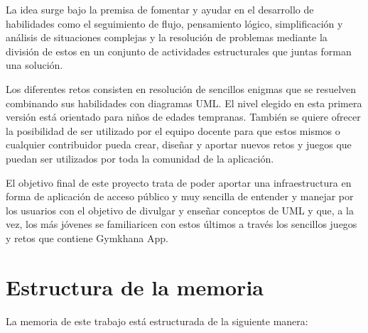 \documentclass[a4paper, 12pt]{book}
\begin{document}
La idea surge bajo la premisa de fomentar y ayudar en el desarrollo de habilidades como el seguimiento de flujo, pensamiento lógico, simplificación y análisis de situaciones complejas y la resolución de problemas mediante la división de estos en un conjunto de actividades estructurales que juntas forman una solución. 

Los diferentes retos consisten en resolución de sencillos enigmas que se resuelven combinando sus habilidades con diagramas UML. El nivel elegido en esta primera versión está orientado para niños de edades tempranas. También se quiere ofrecer la posibilidad de ser utilizado por el equipo docente para que estos mismos o cualquier contribuidor pueda crear, diseñar y aportar nuevos retos y juegos que puedan ser utilizados por toda la comunidad de la aplicación. 

El objetivo final de este proyecto trata de poder aportar una infraestructura en forma de aplicación de acceso público y muy sencilla de entender y manejar por los usuarios con el objetivo de divulgar y enseñar conceptos de UML y que, a la vez, los más jóvenes se familiaricen con estos últimos a través los sencillos juegos y retos que contiene Gymkhana App. 


\section{Estructura de la memoria}
\label{sec:estructura}

La memoria de este trabajo está estructurada de la siguiente manera: 
\end{document}
